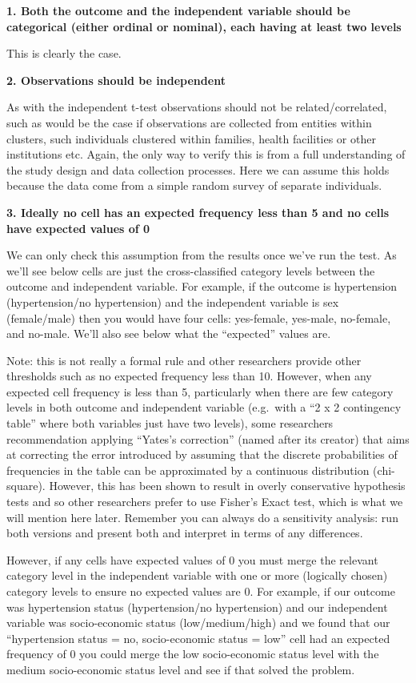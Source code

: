 \documentclass[
]{book}
\begin{document}
\textbf{1. Both the outcome and the independent variable should be categorical (either ordinal or nominal), each having at least two levels}

This is clearly the case.

\textbf{2. Observations should be independent}

As with the independent t-test observations should not be related/correlated, such as would be the case if observations are collected from entities within clusters, such individuals clustered within families, health facilities or other institutions etc. Again, the only way to verify this is from a full understanding of the study design and data collection processes. Here we can assume this holds because the data come from a simple random survey of separate individuals.

\textbf{3. Ideally no cell has an expected frequency less than 5 and no cells have expected values of 0}

We can only check this assumption from the results once we've run the test. As we'll see below cells are just the cross-classified category levels between the outcome and independent variable. For example, if the outcome is hypertension (hypertension/no hypertension) and the independent variable is sex (female/male) then you would have four cells: yes-female, yes-male, no-female, and no-male. We'll also see below what the ``expected'' values are.

Note: this is not really a formal rule and other researchers provide other thresholds such as no expected frequency less than 10. However, when any expected cell frequency is less than 5, particularly when there are few category levels in both outcome and independent variable (e.g.~with a ``2 x 2 contingency table'' where both variables just have two levels), some researchers recommendation applying ``Yates's correction'' (named after its creator) that aims at correcting the error introduced by assuming that the discrete probabilities of frequencies in the table can be approximated by a continuous distribution (chi-square). However, this has been shown to result in overly conservative hypothesis tests and so other researchers prefer to use Fisher's Exact test, which is what we will mention here later. Remember you can always do a sensitivity analysis: run both versions and present both and interpret in terms of any differences.

However, if any cells have expected values of 0 you must merge the relevant category level in the independent variable with one or more (logically chosen) category levels to ensure no expected values are 0. For example, if our outcome was hypertension status (hypertension/no hypertension) and our independent variable was socio-economic status (low/medium/high) and we found that our ``hypertension status = no, socio-economic status = low'' cell had an expected frequency of 0 you could merge the low socio-economic status level with the medium socio-economic status level and see if that solved the problem.
\end{document}
